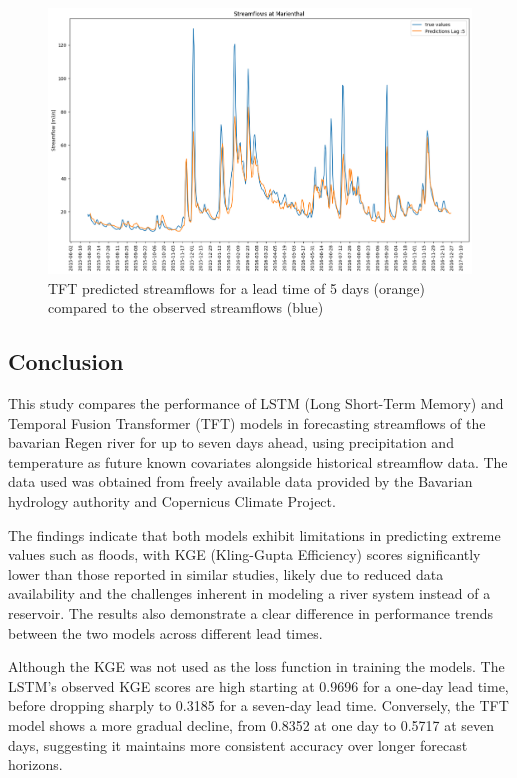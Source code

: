 \documentclass[
]{article}
\begin{document}
\begin{figure}

{\centering \includegraphics[width=500px]{work/07-hydroLSTM/images/lag5_tft} 

}

\caption{TFT predicted streamflows for a lead time of 5 days (orange) compared to the observed streamflows (blue)}\label{fig:8}
\end{figure}

\hypertarget{conclusion}{%
\subsection{Conclusion}\label{conclusion}}

This study compares the performance of LSTM (Long Short-Term Memory) and
Temporal Fusion Transformer (TFT) models in forecasting streamflows of
the bavarian Regen river for up to seven days ahead, using precipitation
and temperature as future known covariates alongside historical
streamflow data. The data used was obtained from freely available data
provided by the Bavarian hydrology authority and Copernicus Climate
Project.

The findings indicate that both models exhibit limitations in predicting
extreme values such as floods, with KGE (Kling-Gupta Efficiency) scores
significantly lower than those reported in similar studies, likely due
to reduced data availability and the challenges inherent in modeling a
river system instead of a reservoir. The results also demonstrate a
clear difference in performance trends between the two models across
different lead times.

Although the KGE was not used as the loss function in training the
models. The LSTM's observed KGE scores are high starting at 0.9696 for a
one-day lead time, before dropping sharply to 0.3185 for a seven-day
lead time. Conversely, the TFT model shows a more gradual decline, from
0.8352 at one day to 0.5717 at seven days, suggesting it maintains more
consistent accuracy over longer forecast horizons.
\end{document}
